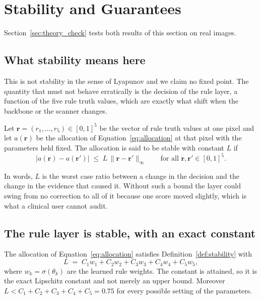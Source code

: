 \section{Stability and Guarantees}
\label{sec:stability}

Section~\ref{sec:theory_check} tests both results of this section on real images.

\subsection{What stability means here}
\label{sec:stability_def}
This is not stability in the sense of Lyapunov and we claim no fixed point. The quantity that must
not behave erratically is the decision of the rule layer, a function of the five rule truth values,
which are exactly what shift when the backbone or the scanner changes.

\begin{definition}
\label{def:stability}
Let $\mathbf{r} = (r_1, \ldots, r_5) \in [0,1]^5$ be the vector of rule truth values at one pixel and
let $a(\mathbf{r})$ be the allocation of Equation~\eqref{eq:allocation} at that pixel with the
parameters held fixed. The allocation is said to be stable with constant $L$ if
\begin{equation}
\big| a(\mathbf{r}) - a(\mathbf{r}') \big| \;\le\; L \, \lVert \mathbf{r} - \mathbf{r}' \rVert_\infty
\qquad \text{for all } \mathbf{r}, \mathbf{r}' \in [0,1]^5 .
\label{eq:stability_def}
\end{equation}
\end{definition}

In words, $L$ is the worst case ratio between a change in the decision and the change in the
evidence that caused it. Without such a bound the layer could swing from no correction to all of it
because one score moved slightly, which is what a clinical user cannot audit.

\subsection{The rule layer is stable, with an exact constant}

\begin{theorem}
\label{thm:stability}
The allocation of Equation~\eqref{eq:allocation} satisfies Definition~\ref{def:stability} with
\begin{equation}
L \;=\; C_1 w_1 + C_2 w_2 + C_3 w_3 + C_4 w_4 + C_5 w_5 ,
\label{eq:lipschitz}
\end{equation}
where $w_k = \sigma(\theta_k)$ are the learned rule weights. The constant is attained, so it is the
exact Lipschitz constant and not merely an upper bound. Moreover $L < C_1 + C_2 + C_3 + C_4 + C_5 =
0.75$ for every possible setting of the parameters.
\end{theorem}

